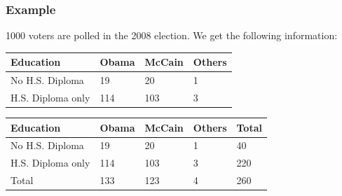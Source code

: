 \begin{frame}
  \frametitle{Example }

  1000 voters are polled in the 2008 election. We get the following
  information: \\
  {
    \begin{tabular}{l|l|l|l}
      Education & Obama & McCain & Others  \\ \hline
      No H.S. Diploma & 19 & 20 & 1   \\
      H.S. Diploma only & 114 & 103 & 3 
    \end{tabular}
  }
  {
    \begin{tabular}{l|l|l|l|l}
      Education & Obama & McCain & Others & Total \\ \hline
      No H.S. Diploma & 19 & 20 & 1 & 40 \\
      H.S. Diploma only & 114 & 103 & 3 & 220 \\ \hline
      Total & 133 & 123 & 4 & 260
    \end{tabular}
  }



\end{frame}


%
%
%
%
%  




